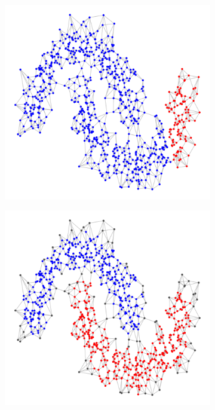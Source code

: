 \documentclass{article}
\newcommand{\1}{\mathbf{1}}
\theoremstyle{aldenthm}
\theoremstyle{aldenrmrk}
\begin{document}
\begin{figure}
\begin{adjustbox}{minipage=\linewidth,scale=0.8}
\begin{subfigure}{.24\linewidth}
			\caption{}
		\end{subfigure}
		\begin{subfigure}{.24\linewidth}
			\includegraphics[width=\linewidth]{example2plots/row3_conductance_cluster}
			\caption{}
		\end{subfigure}
		\begin{subfigure}{.24\linewidth}
			\includegraphics[width=\linewidth]{example2plots/row3_density_cluster}
			\caption{}
		\end{subfigure}
		

\end{adjustbox}
\end{figure}
\end{document}
